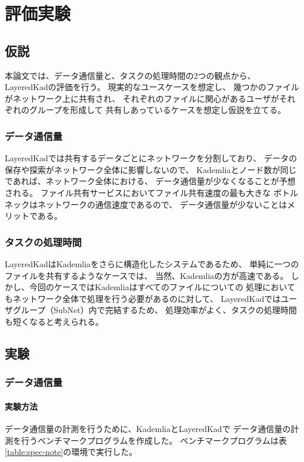 \documentclass[sotsuron]{jcsie}
\begin{document}
\chapter{評価実験}
\section{仮説}
本論文では、データ通信量と、タスクの処理時間の2つの観点から、
LayeredKadの評価を行う。
現実的なユースケースを想定し、
幾つかのファイルがネットワーク上に共有され、
それぞれのファイルに関心があるユーザがそれぞれのグループを形成して
共有しあっているケースを想定し仮説を立てる。
\subsection{データ通信量}
LayeredKadでは共有するデータごとにネットワークを分割しており、
データの保存や探索がネットワーク全体に影響しないので、
Kademliaとノード数が同じであれば、ネットワーク全体における、
データ通信量が少なくなることが予想される。
ファイル共有サービスにおいてファイル共有速度の最も大きな
ボトルネックはネットワークの通信速度であるので、
データ通信量が少ないことはメリットである。
\subsection{タスクの処理時間}
LayeredKadはKademliaをさらに構造化したシステムであるため、
単純に一つのファイルを共有するようなケースでは、
当然、Kademliaの方が高速である。
しかし、今回のケースではKademliaはすべてのファイルについての
処理においてもネットワーク全体で処理を行う必要があるのに対して、
LayeredKadではユーザグループ（SubNet）内で完結するため、
処理効率がよく、タスクの処理時間も短くなると考えられる。

\section{実験}
\subsection{データ通信量}
\subsubsection{実験方法}
データ通信量の計測を行うために、KademliaとLayeredKadで
データ通信量の計測を行うベンチマークプログラムを作成した。
ベンチマークプログラムは表\ref{table:spec-note}の環境で実行した。
\end{document}
